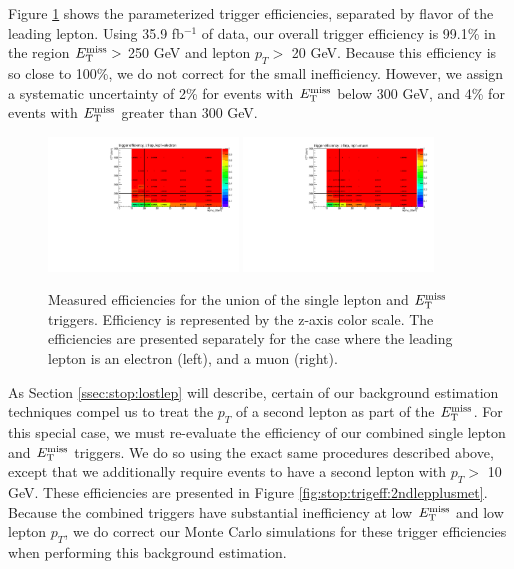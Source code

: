Figure \ref{fig:stop:trigeff:1lepmet} shows the parameterized trigger
efficiencies, separated by flavor of the leading lepton. Using 35.9 fb$^{-1}$
of data, our overall trigger efficiency is 99.1\% in the region $E_\text{T}^\text{miss} >$
250 GeV and lepton $p_T >$ 20 GeV. Because this efficiency is so close
to 100\%, we do not correct for the small inefficiency. However, we
assign a systematic uncertainty of 2\% for events with $E_\text{T}^\text{miss}$ below 300
GeV, and 4\% for events with $E_\text{T}^\text{miss}$ greater than 300 GeV.

\begin{figure}[htb]
\centering
\includegraphics[width=0.45\textwidth]{figures/TriggerEff_el.pdf}
\includegraphics[width=0.45\textwidth]{figures/TriggerEff_mu.pdf}
\caption{Measured efficiencies for the union of the single lepton and
  $E_\text{T}^\text{miss}$ triggers. Efficiency is represented by the z-axis color scale. The
  efficiencies are presented separately for the case where the leading
  lepton is an electron (left), and a muon (right).}
\label{fig:stop:trigeff:1lepmet}
\end{figure}

As Section \ref{ssec:stop:lostlep} will describe, certain of our
background estimation techniques compel us to treat the $p_T$ of a
second lepton as part of the $E_\text{T}^\text{miss}$. For this special case, we must
re-evaluate the efficiency of our combined single lepton and $E_\text{T}^\text{miss}$
triggers. We do so using the exact same procedures described above,
except that we additionally require events to have a second lepton
with $p_T >$ 10 GeV. These efficiencies are presented in Figure
\ref{fig:stop:trigeff:2ndlepplusmet}. Because the combined triggers
have substantial inefficiency at low $E_\text{T}^\text{miss}$ and low lepton $p_T$, we
do correct our Monte Carlo simulations for these trigger
efficiencies when performing this background estimation.


